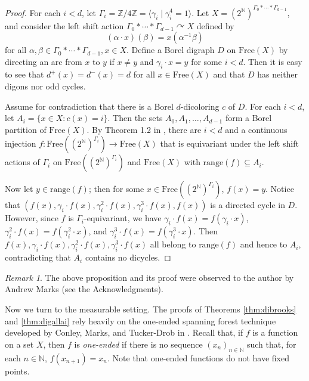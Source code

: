 \documentclass[psamsfonts]{amsart}
\theoremstyle{definition}
\newcommand{\N}{\mathbb N}
\theoremstyle{remark}
\newtheorem{rem}[thm]{Remark}
\numberwithin{equation}{section}
\begin{document}
\begin{proof}
    For each $i < d$, let $\Gamma_i = \mathbb{Z}/4\mathbb{Z} = \langle \gamma_i \mathrel{\vert} \gamma_i^4 = 1 \rangle$. Let $X =(2^{\N})^{\Gamma_0 * \cdots * \Gamma_{d-1}}$, and consider the left shift action $\Gamma_0 * \cdots * \Gamma_{d-1} \curvearrowright X$ defined by
    $$(\alpha \cdot x)(\beta) = x(\alpha^{-1}\beta)$$
    for all $\alpha, \beta \in \Gamma_0 * \cdots * \Gamma_{d-1}, x \in X$. Define a Borel digraph $D$ on $\text{Free}(X)$ by directing an arc from $x$ to $y$ if $x \neq y$ and $\gamma_i \cdot x = y$ for some $i < d$. Then it is easy to see that $d^+(x) = d^-(x) = d$ for all $x \in \text{Free}(X)$ and that $D$ has neither digons nor odd cycles.
    
    Assume for contradiction that there is a Borel $d$-dicoloring $c$ of $D$. For each $i < d$, let $A_i = \{x \in X : c(x) = i \}$. Then the sets $A_0, A_1, \dots, A_{d - 1}$ form a Borel partition of $\text{Free}(X)$. By Theorem 1.2 in \cite{marks2017}, there are $i < d$ and a continuous injection $f : \text{Free}((2^{\N})^{\Gamma_i}) \rightarrow \text{Free}(X)$ that is equivariant under the left shift actions of $\Gamma_i$ on $\text{Free}((2^{\N})^{\Gamma_i})$ and $\text{Free}(X)$ with $\text{range}(f) \subseteq A_i$.

    Now let $y \in \text{range}(f)$; then for some $x \in \text{Free}((2^{\N})^{\Gamma_i})$, $f(x) = y$. Notice that $(f(x), \gamma_i \cdot f(x), \gamma_i^2 \cdot f(x), \gamma_i^3 \cdot f(x), f(x))$ is a directed cycle in $D$. However, since $f$ is $\Gamma_i$-equivariant, we have $\gamma_i \cdot f(x) = f(\gamma_i \cdot x)$, $\gamma_i^2 \cdot f(x) = f(\gamma_i^2 \cdot x)$, and $\gamma_i^3 \cdot f(x) = f(\gamma_i^3 \cdot x)$. Then $f(x), \gamma_i \cdot f(x), \gamma_i^2 \cdot f(x), \gamma_i^3 \cdot f(x)$ all belong to $\text{range}(f)$ and hence to $A_i$, contradicting that $A_i$ contains no dicycles.
\end{proof}

\begin{rem}
    The above proposition and its proof were observed to the author by Andrew Marks (see the Acknowledgments).
\end{rem}

Now we turn to the measurable setting. The proofs of Theorems \ref{thm:dibrooks} and \ref{thm:digallai} rely heavily on the one-ended spanning forest technique developed by Conley, Marks, and Tucker-Drob in \cite{cmt2016}. Recall that, if $f$ is a function on a set $X$, then $f$ is {\it one-ended} if there is no sequence $(x_n)_{n \in \N}$ such that, for each $n \in \N$, $f(x_{n + 1}) = x_n$. Note that one-ended functions do not have fixed points.
\end{document}
